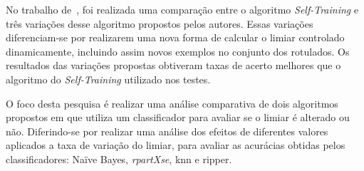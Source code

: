     No trabalho de~, foi realizada uma comparação entre o algoritmo \textit{Self\hyp{Training}} e três variações desse algoritmo propostos pelos autores. Essas variações diferenciam\hyp{se} por realizarem uma nova forma de calcular o limiar controlado dinamicamente, incluindo assim novos exemplos no conjunto dos rotulados. Os resultados das variações propostas obtiveram taxas de acerto melhores que o algoritmo do \textit{Self\hyp{Training}} utilizado nos testes. 
    
    
    
    O foco desta pesquisa é realizar uma análise comparativa de dois algoritmos propostos em  que utiliza um classificador para avaliar se o limiar é alterado ou não. Diferindo\hyp{se} por realizar uma análise dos efeitos de diferentes valores aplicados a taxa de variação do limiar, para avaliar as acurácias obtidas pelos classificadores: Na\"ive Bayes, \textit{rpartXse}, \ac{knn} e \ac{ripper}.